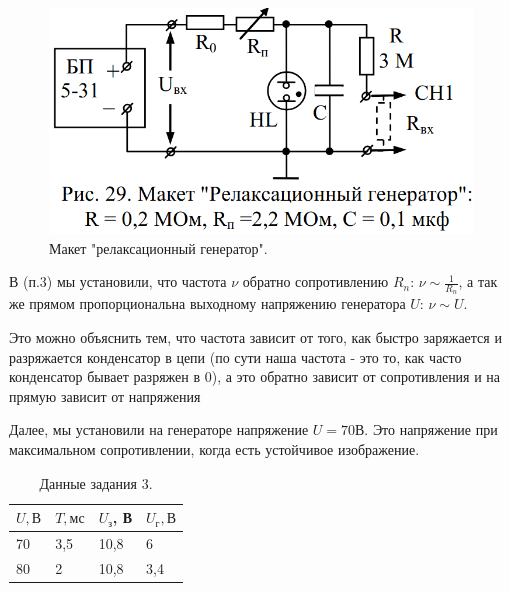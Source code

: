 \documentclass[a4paper,12pt]{article}
\begin{document}
\begin{figure}[h!]
	\begin{center}
		\includegraphics[scale=0.6]{scheme_3.png}
	\end{center}
	\caption{Макет "релаксационный генератор".}
\end{figure}

В (п.3) мы установили, что частота $\nu$ обратно сопротивлению $R_n$: $\nu \sim \frac{1}{R_n}$, а так же прямом пропорциональна выходному напряжению генератора $U$: $\nu \sim U$.

Это можно объяснить тем, что частота зависит от того, как быстро заряжается и разряжается конденсатор в цепи (по сути наша частота - это то, как часто конденсатор бывает разряжен в 0), а это обратно зависит от сопротивления и на прямую зависит от напряжения

Далее, мы установили на генераторе напряжение $U = 70В$. Это напряжение при максимальном сопротивлении, когда есть устойчивое изображение.

\begin{table}[!ht]
    \centering
    \begin{tabular}{|l|l|l|l|}
    \hline
        $U, В$ & $T, мс$ & $U_з$, В & $U_г, В$ \\ \hline
        70 & 3,5 & 10,8 & 6 \\ \hline
        80 & 2 & 10,8 & 3,4 \\ \hline
    \end{tabular}
    \caption{Данные задания 3.}
\end{table}
\end{document}
